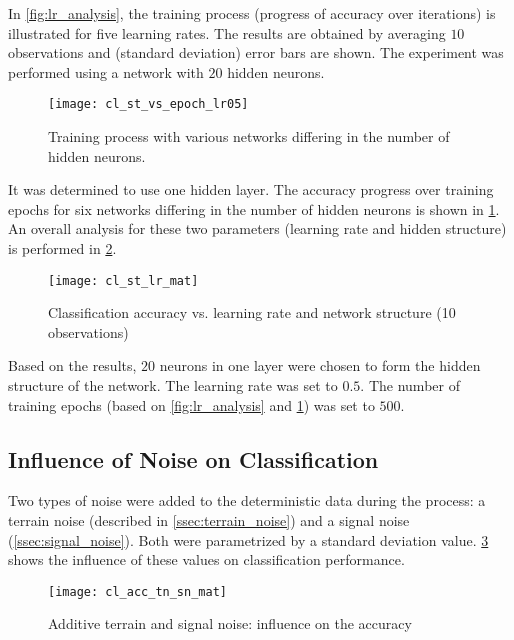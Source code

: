 In \cref{fig:lr_analysis}, the training process (progress of accuracy over iterations) is illustrated for five learning rates. The results are obtained by averaging $ 10 $ observations and (standard deviation) error bars are shown. The experiment was performed using a network with $ 20 $ hidden neurons.

\begin{figure}[H]
  \centering
  \texttt{[image: cl\_st\_vs\_epoch\_lr05]}
  \caption{Training process with various networks differing in the number of hidden neurons.}
  \label{fig:st_analysis}
\end{figure}

It was determined to use one hidden layer. The accuracy progress over training epochs for six networks differing in the number of hidden neurons is shown in \cref{fig:st_analysis}. An overall analysis for these two parameters (learning rate and hidden structure) is performed in \cref{fig:acc_st_lr_mat}.

\begin{figure}[H]
  \centering
  \texttt{[image: cl\_st\_lr\_mat]}
  \caption{Classification accuracy vs. learning rate and network structure (10 observations)}
  \label{fig:acc_st_lr_mat}
\end{figure}

Based on the results, $ 20 $ neurons in one layer were chosen to form the hidden structure of the network. The learning rate was set to $ 0.5 $. The number of training epochs (based on \cref{fig:lr_analysis} and \cref{fig:st_analysis}) was set to $ 500 $.

\subsection{Influence of Noise on Classification} \label{ssec:influence_of_noise_on_classification}
Two types of noise were added to the deterministic data during the process: a terrain noise (described in \cref{ssec:terrain_noise}) and a signal noise (\cref{ssec:signal_noise}). Both were parametrized by a standard deviation value. \cref{fig:acc_tn_sn_mat} shows the influence of these values on classification performance.

\begin{figure}[H]
  \centering
  \texttt{[image: cl\_acc\_tn\_sn\_mat]}
  \caption{Additive terrain and signal noise: influence on the accuracy}
  \label{fig:acc_tn_sn_mat}
\end{figure}

